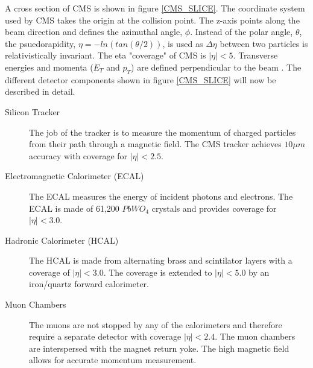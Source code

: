 A cross section of CMS is shown in figure \ref{CMS_SLICE}. The coordinate system used by CMS takes the origin at the collision point. The z-axis points along the beam direction and defines the azimuthal angle, $\phi$. Instead of the polar angle, $\theta$, the psuedorapidity, $\eta=-ln(tan(\theta/2))$, is used as $\Delta \eta$ between two particles is relativistically invariant. The eta "coverage" of CMS is $|\eta|<5$. Transverse energies and momenta ($E_T $ and $p_T$)  are defined perpendicular to the beam \cite{cmsiop}. The different detector components shown in figure \ref{CMS_SLICE} will now be described in detail.
\begin{description}
\item[Silicon Tracker]The job of the tracker is to measure the momentum of charged particles from their path through a magnetic field. The CMS tracker achieves $10\mu m$ accuracy with coverage for $|\eta|<2.5$.
\item[Electromagnetic Calorimeter (ECAL)] The ECAL measures the energy of incident photons and electrons. The ECAL is made of 61,200 $PbWO_4$ crystals and provides coverage for $|\eta|<3.0$\cite{ecal}.
 \item[Hadronic Calorimeter (HCAL)] The HCAL is made from alternating brass and scintilator layers with a coverage of $|\eta|<3.0$\cite{hcal}. The coverage is extended to  $|\eta|<5.0$ by an iron/quartz forward calorimeter\cite{hfhcal}. 
 \item[Muon Chambers]The muons are not stopped by any of the calorimeters and therefore require a separate detector with coverage $|\eta| < 2.4$. The muon chambers are interspersed with the magnet return yoke. The high magnetic field allows for accurate momentum measurement\cite{muons}.
\end{description}